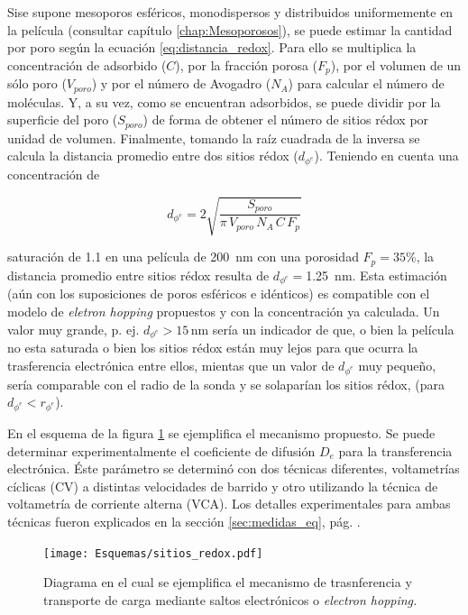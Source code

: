 	 	 Si\space se supone mesoporos esféricos, monodispersos y distribuidos uniformemente en la película (consultar capítulo \ref{chap:Mesoporosos}), se puede estimar la cantidad \ru\space por poro según la ecuación \ref{eq:distancia_redox}. Para ello se multiplica la concentración de \ru\space adsorbido ($C$), por la fracción porosa ($F_p$), por el volumen de un sólo poro ($V_{poro}$) y por el número de Avogadro ($N_{A}$) para calcular el número de moléculas. Y, a su vez, como se encuentran adsorbidos, se puede dividir por la superficie del poro ($S_{poro}$) de forma de obtener el número de sitios rédox por unidad de volumen. Finalmente, tomando la raíz cuadrada de la inversa se calcula la distancia promedio entre dos sitios rédox ($d_{\phi^{e}}$). Teniendo en cuenta una concentración de \linebreak
	 		
	 		\begin{equation}
					d_{\phi^{e}}=2\sqrt{\frac{S_{poro}}{\pi\, V_{poro}\, N_A\, C\, F_p}}
					\label{eq:distancia_redox}
			\end{equation}

	     saturación de \SI{1,1}{\Molar} en una película de \SI{200}{nm} con una porosidad $F_p=35\%$, la distancia promedio entre sitios rédox resulta de $d_{\phi^{e}}=$\SI{1.25}{nm}. Esta estimación (aún con los suposiciones de poros esféricos e idénticos) es compatible con el modelo de \textit{eletron hopping} propuestos y con la concentración ya calculada. Un valor muy grande, p. ej. $d_{\phi^{e}}>15\, \text{nm}$ sería un indicador de que, o bien la película no esta saturada o bien los sitios rédox están muy lejos para que ocurra la trasferencia electrónica entre ellos, mientas que un valor de $d_{\phi^{e}}$ muy pequeño, sería comparable con el radio de la sonda y se solaparían los sitios rédox, (para $d_{\phi^{e}} < r_{\phi^{e}}$). 
	
	     En el esquema de la figura \ref{fig:sitios_redox} se ejemplifica el mecanismo propuesto. Se puede determinar experimentalmente el coeficiente de difusión $D_e$ para la transferencia electrónica. Éste parámetro se determinó con dos técnicas diferentes, voltametrías cíclicas (CV) a distintas velocidades de barrido y otro utilizando la técnica de voltametría de corriente alterna (VCA). Los detalles experimentales para ambas técnicas fueron explicados en la sección \ref{sec:medidas_eq}, pág. \pageref{sec:medidas_eq}.
			\begin{figure}[ht!]
					\centering
			 	    \texttt{[image: Esquemas/sitios\_redox.pdf]}
			        \caption[Mecanismo de transferencia de electrones]{Diagrama en el cual se ejemplifica el mecanismo de trasnferencia y transporte de carga mediante saltos electrónicos o \textit{electron hopping.}}
			        \label{fig:sitios_redox}
			      	\end{figure} 

